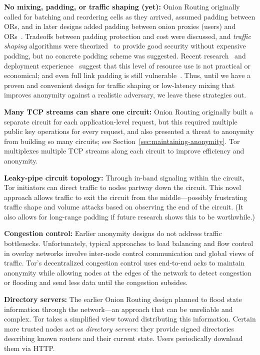 \documentclass[twocolumn]{article}
\begin{document}
\textbf{No mixing, padding, or traffic shaping (yet):} Onion
Routing originally called for batching and reordering cells as they arrived,
assumed padding between ORs, and in
later designs added padding between onion proxies (users) and
ORs~\cite{or-ih96,or-jsac98}.  Tradeoffs between padding protection
and cost were discussed, and \emph{traffic shaping} algorithms were
theorized~\cite{or-pet00} to provide good security without expensive
padding, but no concrete padding scheme was suggested.
Recent research~\cite{econymics}
and deployment experience~\cite{freedom21-security} suggest that this
level of resource use is not practical or economical; and even full
link padding is still vulnerable~\cite{defensive-dropping}. Thus,
until we have a proven and convenient design for traffic shaping or
low-latency mixing that improves anonymity against a realistic
adversary, we leave these strategies out.

\textbf{Many TCP streams can share one circuit:} Onion Routing originally
built a separate circuit for each
application-level request, but this required
multiple public key operations for every request, and also presented
a threat to anonymity from building so many circuits; see
Section~\ref{sec:maintaining-anonymity}.  Tor multiplexes multiple TCP
streams along each circuit to improve efficiency and anonymity.

\textbf{Leaky-pipe circuit topology:} Through in-band signaling
within the circuit, Tor initiators can direct traffic to nodes partway
down the circuit. This novel approach
allows traffic to exit the circuit from the middle---possibly
frustrating traffic shape and volume attacks based on observing the end
of the circuit. (It also allows for long-range padding if
future research shows this to be worthwhile.)

\textbf{Congestion control:} Earlier anonymity designs do not
address traffic bottlenecks. Unfortunately, typical approaches to
load balancing and flow control in overlay networks involve inter-node
control communication and global views of traffic. Tor's decentralized
congestion control uses end-to-end acks to maintain anonymity
while allowing nodes at the edges of the network to detect congestion
or flooding and send less data until the congestion subsides.

\textbf{Directory servers:} The earlier Onion Routing design
planned to flood state information through the network---an approach
that can be unreliable and complex. %
Tor takes a simplified view toward distributing this
information. Certain more trusted nodes act as \emph{directory
servers}: they provide signed directories describing known
routers and their current state. Users periodically download them
via HTTP.
\end{document}
